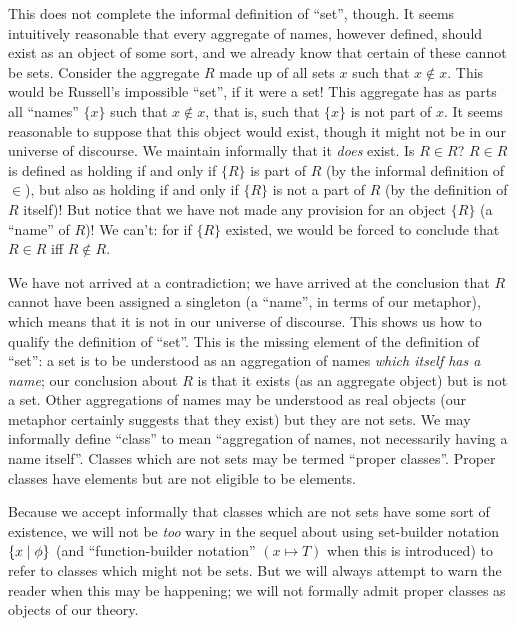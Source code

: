 This does not complete the informal definition of ``set'', though.  It
seems intuitively reasonable that every aggregate of names, however
defined, should exist as an object of some sort, and we already know
that certain of these cannot be sets.  Consider the aggregate $R$ made
up of all sets $x$ such that $x \not\in x$.  This would be Russell's
impossible ``set'', if it were a set!  This aggregate has as
parts all 
``names'' $\{x\}$ such that $x \not\in x$, that is, such that $\{x\}$
is not part of $x$.  It seems reasonable to suppose that this object
would exist, though it might not be in our universe of discourse.  We maintain informally that it {\itshape does\/} exist.  Is
$R \in R$?  $R \in R$ is defined as holding if and only if $\{R\}$ is part of
$R$ (by the informal definition of $\in$), but also as holding if and only if
$\{R\}$ is not a part of $R$ (by the
definition of $R$ itself)!  But notice that we have not made any provision for
an object $\{R\}$ (a ``name'' of $R$)!  We can't: for if $\{R\}$ existed, we
would be forced to conclude that $R \in R$ iff $R \not\in R$.

We have not arrived at a contradiction; we have arrived at the
conclusion that $R$ cannot have been assigned a singleton (a ``name'', in terms of our metaphor), which means that it is not in
our universe of discourse.  This shows us how to qualify the definition of
``set''.
This is the missing element of the definition of ``set'': a set is
to be understood as an aggregation of names {\itshape which itself has a
name\/}; our conclusion about $R$ is that it exists (as an aggregate
object) but is not a set.  Other aggregations of names may be
understood as real objects (our metaphor certainly suggests that they
exist) but they are not sets.  We may informally define ``class'' to
mean ``aggregation of names, not necessarily having a name itself''.
Classes which are not sets may be termed ``proper classes''.  Proper
classes have elements but are not eligible to be elements.

Because we accept informally that classes which are not sets have some
sort of existence, we will not be {\itshape too\/} wary in the sequel about
using set-builder notation $\{x \mid \phi\}$ (and
``function-builder notation'' $(x
\mapsto T)$ when this is introduced) to refer to classes which might
not be sets.  But we will always attempt to warn the reader when this
may be happening; we will not formally admit proper classes as objects
of our theory.

